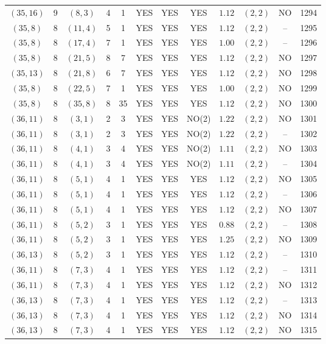 \begin{longtable}{|c|c|c|c|c|c|c|c|c|c|c|c|}
$(35,16)$ & 9 & $(8,3)$ & 4 & 1 & YES & YES & YES & $1.12$ & $(2,2)$ & NO & 1294\\
$(35,8)$ & 8 & $(11,4)$ & 5 & 1 & YES & YES & YES & $1.12$ & $(2,2)$ & -- & 1295\\
$(35,8)$ & 8 & $(17,4)$ & 7 & 1 & YES & YES & YES & $1.00$ & $(2,2)$ & -- & 1296\\
$(35,8)$ & 8 & $(21,5)$ & 8 & 7 & YES & YES & YES & $1.12$ & $(2,2)$ & NO & 1297\\
$(35,13)$ & 8 & $(21,8)$ & 6 & 7 & YES & YES & YES & $1.12$ & $(2,2)$ & NO & 1298\\
$(35,8)$ & 8 & $(22,5)$ & 7 & 1 & YES & YES & YES & $1.00$ & $(2,2)$ & NO & 1299\\
$(35,8)$ & 8 & $(35,8)$ & 8 & 35 & YES & YES & YES & $1.12$ & $(2,2)$ & NO & 1300\\
$(36,11)$ & 8 & $(3,1)$ & 2 & 3 & YES & YES & NO(2) & $1.22$ & $(2,2)$ & NO & 1301\\
$(36,11)$ & 8 & $(3,1)$ & 2 & 3 & YES & YES & NO(2) & $1.22$ & $(2,2)$ & -- & 1302\\
$(36,11)$ & 8 & $(4,1)$ & 3 & 4 & YES & YES & NO(2) & $1.11$ & $(2,2)$ & NO & 1303\\
$(36,11)$ & 8 & $(4,1)$ & 3 & 4 & YES & YES & NO(2) & $1.11$ & $(2,2)$ & -- & 1304\\
$(36,11)$ & 8 & $(5,1)$ & 4 & 1 & YES & YES & YES & $1.12$ & $(2,2)$ & NO & 1305\\
$(36,11)$ & 8 & $(5,1)$ & 4 & 1 & YES & YES & YES & $1.12$ & $(2,2)$ & -- & 1306\\
$(36,11)$ & 8 & $(5,1)$ & 4 & 1 & YES & YES & YES & $1.12$ & $(2,2)$ & NO & 1307\\
$(36,11)$ & 8 & $(5,2)$ & 3 & 1 & YES & YES & YES & $0.88$ & $(2,2)$ & -- & 1308\\
$(36,11)$ & 8 & $(5,2)$ & 3 & 1 & YES & YES & YES & $1.25$ & $(2,2)$ & NO & 1309\\
$(36,13)$ & 8 & $(5,2)$ & 3 & 1 & YES & YES & YES & $1.12$ & $(2,2)$ & -- & 1310\\
$(36,11)$ & 8 & $(7,3)$ & 4 & 1 & YES & YES & YES & $1.12$ & $(2,2)$ & -- & 1311\\
$(36,11)$ & 8 & $(7,3)$ & 4 & 1 & YES & YES & YES & $1.12$ & $(2,2)$ & NO & 1312\\
$(36,13)$ & 8 & $(7,3)$ & 4 & 1 & YES & YES & YES & $1.12$ & $(2,2)$ & -- & 1313\\
$(36,13)$ & 8 & $(7,3)$ & 4 & 1 & YES & YES & YES & $1.12$ & $(2,2)$ & NO & 1314\\
$(36,13)$ & 8 & $(7,3)$ & 4 & 1 & YES & YES & YES & $1.12$ & $(2,2)$ & NO & 1315\\

\end{longtable}

